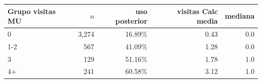 \begin{tabular}{lrrrr}
\toprule
Grupo visitas MU & $n$ & uso posterior & visitas Calc media & mediana \\
\midrule
0 & 3,274 & 16.89\% & 0.43 & 0.0 \\
1-2 & 567 & 41.09\% & 1.28 & 0.0 \\
3 & 129 & 51.16\% & 1.78 & 1.0 \\
4+ & 241 & 60.58\% & 3.12 & 1.0 \\
\bottomrule
\end{tabular}
